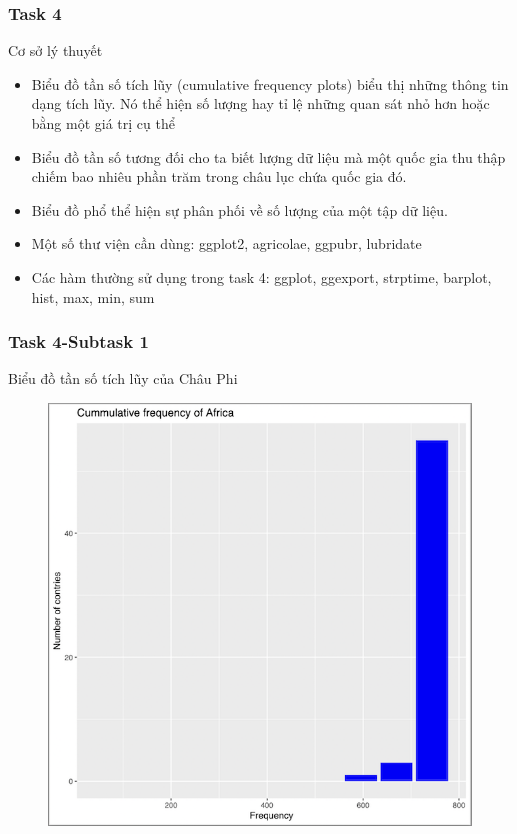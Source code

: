 \documentclass[english,10pt,table]{beamer}
\begin{document}
\frame
{
    \frametitle{Task 4}
    \begin{block}{Cơ sở lý thuyết}
    \begin{itemize}
        \item Biểu đồ tần số tích lũy (cumulative frequency plots) biểu thị những thông tin dạng tích lũy. Nó thể hiện số lượng hay tỉ lệ những quan sát nhỏ hơn hoặc bằng một giá trị cụ thể
        \item Biểu đồ tần số tương đối cho ta biết lượng dữ liệu mà một quốc gia thu thập chiếm bao nhiêu
phần trăm trong châu lục chứa quốc gia đó.
        \item Biểu đồ phổ thể hiện sự phân phối về số lượng của một tập dữ liệu.
        \item Một số thư viện cần dùng: ggplot2, agricolae, ggpubr, lubridate
        \item Các hàm thường sử dụng trong task 4: ggplot, ggexport, strptime, barplot, hist, max, min, sum
    \end{itemize}
    \end{block}
}
\frame
{
    \frametitle{Task 4-Subtask 1}
    \begin{block}{Biểu đồ tần số tích lũy của Châu Phi}
    \begin{figure}
        \centering
        \includegraphics[scale=0.6]{images/4.1.1.png}
    \end{figure}
    \end{block}
}
\end{document}
